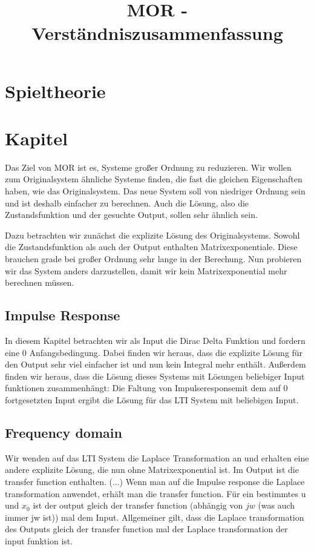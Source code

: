 \documentclass[]{article}
\title{MOR - Verständniszusammenfassung}
\author{}
\begin{document}
\maketitle

\section{Spieltheorie}


\section{Kapitel}
Das Ziel von MOR ist es, Systeme großer Ordnung zu reduzieren. Wir wollen zum Originalsystem ähnliche Systeme finden, die fast die gleichen Eigenschaften haben, wie das Originalsystem. Das neue System soll von niedriger Ordnung sein und ist deshalb einfacher zu berechnen. Auch die Lösung, also die Zustandsfunktion und der gesuchte Output, sollen sehr ähnlich sein. 

Dazu betrachten wir zunächst die explizite Lösung des Originalsystems. Sowohl die Zustandsfunktion als auch der Output enthalten Matrixexponentiale. Diese brauchen grade bei großer Ordnung sehr lange in der Berechung. Nun probieren wir das System anders darzustellen, damit wir kein Matrixexponential mehr berechnen müssen. 

\subsection{Impulse Response}
In diesem Kapitel betrachten wir als Input die Dirac Delta Funktion und fordern eine 0 Anfangsbedingung. Dabei finden wir heraus, dass die explizite Lösung für den Output sehr viel einfacher ist und nun kein Integral mehr enthält. Außerdem finden wir heraus, dass die Lösung dieses Systems mit Lösungen beliebiger Input funktionen zusammenhängt: Die Faltung von \glqq Impulseresponse\grqq mit dem auf 0 fortgesetzten Input ergibt die Lösung für das LTI System mit beliebigen Input.  

\subsection{Frequency domain}
Wir wenden auf das LTI System die Laplace Transformation an und erhalten eine andere explizite Lösung, die nun ohne Matrixexponential ist. Im Output ist die transfer function enthalten. (...) Wenn man auf die Impulse response die Laplace transformation anwendet, erhält man die transfer function. Für ein bestimmtes u und $x_0$ ist der output gleich der transfer function (abhängig von \(jw \) (was auch immer jw ist)) mal dem Input. Allgemeiner gilt, dass die Laplace transformation des Outputs gleich der transfer function mal der Laplace transformation der input funktion ist.   
\end{document}
